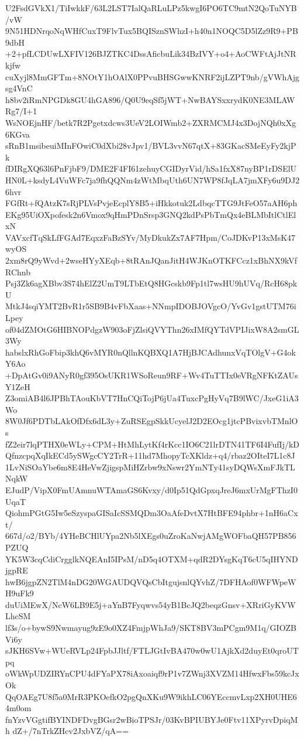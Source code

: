 U2FsdGVkX1/TiIwkkF/63L2LST7IalQaRLuLPz5kwgI6PO6TC9mtN2QoTuNYB/vW
9N51HDNrqoNqWHfCuxT9FlvTux5BQISznSWhzI+h40n1NOQC5D5lZz9R9+PB9dbH
+2+pfLCDUwLXFIV126BJZTKC4DssAficbuLik34BzIVY+o4+AoCWFtAjJtNRkjfw
cuXyjl8MmGFTm+8NOtY1hOAlX0PPvuBHSGwwKNRF2ijLZPT9nb/gVWhAjgsg4VnC
h8bv2iRmNPGDk8GU4hGA896/Q0U9eqSf5jWT+NwBAYSxxrydK0NE3MLAWRg7/I+1
WsNOEjnHF/betk7R2Pgetxdcws3UeV2LOIWmb2+ZXRMCMJ4x3DojNQh0xXg6KGva
sRnB1msibeuiMInFOwiC0dXbi28vJpv1/BVL3vvN67qtX+83GKacSMeEyFy2kjPk
fDIRgXQ63l6PnFjbF9/DME2F4FI61zehuyCGIDyrVid/hSa1fxX87nyBP1rDSElU
HN0L+ksdyL4VuWFc7ja9fhQQNm4zWtMbqUth6UN7WP8fJqLA7jmXFy6u9DJ26hvr
FGfRt+fQAtzK7sRjPLVsPvjeEcplY8B5+iHkkotuk2LdbqcTTG9JtFeO57aAH6ph
EKg95UiOXpofesk2n6Vmox9qHmPDnSrsp3GNQ2kdPsPbTmQx4eBLMbItlCtlElxN
VAVxcfTqSkLfFGAd7EqxzFaBzSYv/MyDkukZx7AF7Hpm/CoJDKvP13xMsK47wyOS
2xm8rQ9yWvd+2wseHYyXEqb+8tRAnJQanJitH4WJKnOTKFCcz1xBhNX9kVfRChnb
Psj3Zk6agXBbv3S74hElZ2UmT9LTbEtQ8HGcskb9Fp1tl7wsHU9hUVq/RcH68pkU
MtkJ4sqiYMT2BvR1r5SB9B4vFbXaas+NNmpIDOBJOVgcO/YvGv1gstUTM76iLpey
of04dZMOtG6HIBNOPdgzW903oFjZlsiQVYThn26xIMfQYTdVPIJixW8A2smGL3Wy
habslxRhGoFbip3khQ6vMYR0nQllnKQBXQ1A7HjBJCAdhunxVqTOlgV+G4okY6Ao
+DpAtGv0i9ANyR0gf395OsUKR1WSoReun9RF+Wv4TuTTIx0eVRgNFKtZAUsY1ZeH
Z3omiAB4l6JPBhTAouKbVT7HnCQiTojP6jUa4TuxcPgHyVq7B9lWC/JxeG1iA3Wo
8W0Jf6PDTbLAkOfDfx6dL3y+ZuRSEgpSkkUcyelJ2D2EOcg1jtcPBvixvbTMnlOs
fZ2eir7lqPTHX0eWLy+CPM+HtMhLytKf4rKcc1IO6C21lrDTN41TF6I4FufIj/kD
QfnzcpqXqIkECd5ySWgcCY2TrR+11hd7MhopyTcXKldz+q4/rbaz2OIteI7L1c8J
1LvNiSOaYbe6m8E4HeVwZjigspMiHZrbw9xNswr2YmNTy41syDQWsXmFJkTLNqkW
EJudP/VipX0FmUAmnuWTAmaGS6Kvxy/d0Ip51QdGpxqJreJ6mxUrMgFThzI0UqaT
QiohmPGtG5Iw5eSzyspaGISaIcSSMQDm3OaAfeDvtX7HtBFE94phbr+1nH6aCxt/
667d/o2/BYb/4YHeBCHlUYpa2Nb5lXEgs0uZroKaNwjAMgWOFbaQH57PB856PZUQ
YK5W3cqCdiCrgglkNQEAnI5IPsM/nD5q4OTXM+qdR2DYsgKqT6cU5qIHYNDjgpRE
hwB6jgpZN2TlM4nDG20WGAUDQVQsCbItgujsnlQYvhZ/7DFHAof0WFWpeWH9uFk9
duUiMEwX/NcW6LB9E5j+aYnB7Fyqwvs54yB1BcJQ2beqzGnsv+XRriGyKVWLhcSM
lf3s/o+bywS9Nwmayug9zE9o0XZ4FmjpWhJa9/SKT8BV3mPCgm9M1q/GIOZBVi6y
sJKH6SVw+WUeRVLp24FpbJJltf/FTLJGtIvBA470w0wU1AjkXd2duyEt0qroUTpq
oWkWpUDZIRYnCPU4dFYaPX78iAxoaiqf9rP1v7ZWnj3XVZM14HfwxFbs59kcJxOk
QqOAEg7U8f5a0MrR3PKOefkO2pgQnXKu9W9ikhLC06YEccmvLxp2XH0UHE64m0om
fnYzvVGgtifBYINDFDvgBGsr2wBioTPSJr/03KvBPIUBYJe0Ftv11XPyrvDpiqMh
dZ+/7nTrkZHcv2JxbVZ/qA==
